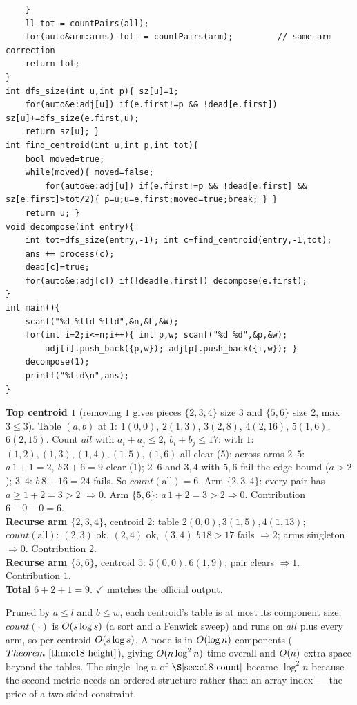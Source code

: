 \begin{lstlisting}
    }
    ll tot = countPairs(all);
    for(auto&arm:arms) tot -= countPairs(arm);         // same-arm correction
    return tot;
}
int dfs_size(int u,int p){ sz[u]=1;
    for(auto&e:adj[u]) if(e.first!=p && !dead[e.first]) sz[u]+=dfs_size(e.first,u);
    return sz[u]; }
int find_centroid(int u,int p,int tot){
    bool moved=true;
    while(moved){ moved=false;
        for(auto&e:adj[u]) if(e.first!=p && !dead[e.first] && sz[e.first]>tot/2){ p=u;u=e.first;moved=true;break; } }
    return u; }
void decompose(int entry){
    int tot=dfs_size(entry,-1); int c=find_centroid(entry,-1,tot);
    ans += process(c);
    dead[c]=true;
    for(auto&e:adj[c]) if(!dead[e.first]) decompose(e.first);
}
int main(){
    scanf("%d %lld %lld",&n,&L,&W);
    for(int i=2;i<=n;i++){ int p,w; scanf("%d %d",&p,&w);
        adj[i].push_back({p,w}); adj[p].push_back({i,w}); }
    decompose(1);
    printf("%lld\n",ans);
}
\end{lstlisting}

\begin{tracebox}[Sample 2 by hand -- \(n=6,\ l=2,\ w=17\), tree \(1\!-\!2(3),2\!-\!3(5),2\!-\!4(13),1\!-\!5(6),5\!-\!6(9)\)]
\textbf{Top centroid \(1\)} (removing \(1\) gives pieces \(\{2,3,4\}\) size 3 and
\(\{5,6\}\) size 2, max \(3\le 3\)). Table \((a,b)\) at \(1\): \(1(0,0)\), \(2(1,3)\),
\(3(2,8)\), \(4(2,16)\), \(5(1,6)\), \(6(2,15)\). Count \(\mathit{all}\) with \(a_i+a_j\le2\),
\(b_i+b_j\le17\): with \(1\): \((1,2),(1,3),(1,4),(1,5),(1,6)\) all clear (5); across arms
\(2\text{--}5\): \(a\,1{+}1{=}2,\ b\,3{+}6{=}9\) clear (1); \(2\text{--}6\) and \(3,4\)
with \(5,6\) fail the edge bound (\(a>2\)); \(3\text{--}4\): \(b\,8{+}16{=}24\) fails.
So \(\mathit{count}(\text{all})=6\). Arm \(\{2,3,4\}\): every pair has \(a\ge1{+}2=3>2\)
\(\Rightarrow0\). Arm \(\{5,6\}\): \(a\,1{+}2=3>2\Rightarrow0\). Contribution \(6-0-0=6\).\\
\textbf{Recurse arm \(\{2,3,4\}\),} centroid \(2\): table \(2(0,0),3(1,5),4(1,13)\);
\(\mathit{count}(\text{all})\): \((2,3)\) ok, \((2,4)\) ok, \((3,4)\) \(b\,18>17\) fails
\(\Rightarrow2\); arms singleton \(\Rightarrow0\). Contribution \(2\).\\
\textbf{Recurse arm \(\{5,6\}\),} centroid \(5\): \(5(0,0),6(1,9)\); pair clears
\(\Rightarrow1\). Contribution \(1\).\\
\textbf{Total} \(6+2+1=9\). \(\checkmark\) matches the official output.
\end{tracebox}

\begin{complexitybox}
Pruned by \(a\le l\) and \(b\le w\), each centroid's table is at most its component size;
\(\mathit{count}(\cdot)\) is \(O(s\log s)\) (a sort and a Fenwick sweep) and runs on
\(\mathit{all}\) plus every arm, so per centroid \(O(s\log s)\). A node is in
\(O(\log n)\) components (\(\thmref{c18-height}\)), giving \(O(n\log^2 n)\) time
overall and \(O(n)\) extra space beyond the tables. The single \(\log n\) of
\(\secref{c18-count}\) became \(\log^2 n\) because the second metric needs an ordered
structure rather than an array index --- the price of a two-sided constraint.
\end{complexitybox}


